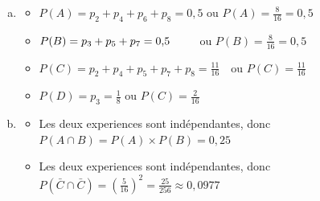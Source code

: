 \documentclass[12pt, a4paper]{article}
\begin{document}
\begin{Exercise}[number={71}]
\begin{enumerate}[a)]
        \item \begin{itemize}
                \item $P(A)=p_2+p_4+p_6+p_8=0{,}5$ \qquad ou \qquad $P(A)=\frac{8}{16}=0{,}5$                     %
                \item $P(B)=p_3+p_5+p_7=0{,}5\hphantom{+p_8\ \,}$ \qquad ou \qquad $P(B)=\frac{8}{16}=0{,}5$
                \item $P(C)=p_2+p_4+p_5+p_7+p_8=\frac{11}{16}$\ \ ou \qquad $P(C)=\frac{11}{16}$
                \item $P(D)=p_3=\frac{1}{8}$ \hspace{3cm} \quad ou \qquad $P(C)=\frac{2}{16}$
              \end{itemize} \medbreak
        \item \begin{itemize}
                \item Les deux experiences sont indépendantes, donc $P(A\cap B)=P(A)\times P(B)=0{,}25$
                \item Les deux experiences sont indépendantes, donc $P(\bar{C}\cap\bar{C})=\left(\frac{5}{16}\right)^2=\frac{25}{256}\approx 0{,}0977$
              \end{itemize}
      \end{enumerate}
    \end{Exercise}
\end{document}
